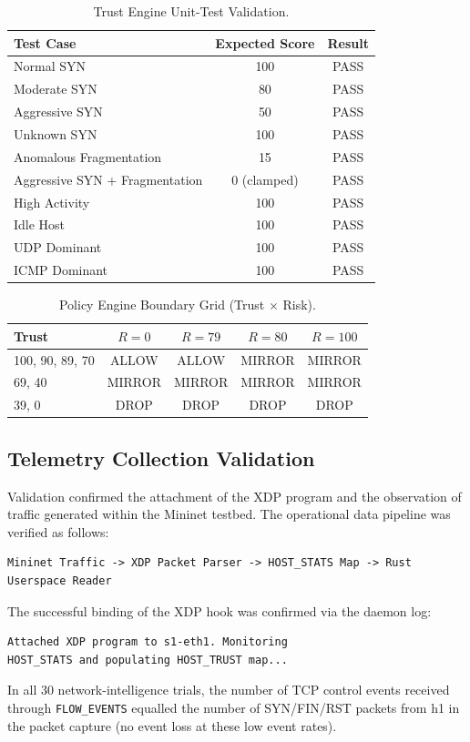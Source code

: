 \documentclass[conference]{IEEEtran}
\begin{document}
\begin{table}[h]
\centering
\caption{Trust Engine Unit-Test Validation.}
\label{tab:unitresults}
\begin{tabular}{lcc}
\toprule
Test Case & Expected Score & Result \\
\midrule
Normal SYN & 100 & PASS \\
Moderate SYN & 80 & PASS \\
Aggressive SYN & 50 & PASS \\
Unknown SYN & 100 & PASS \\
Anomalous Fragmentation & 15 & PASS \\
Aggressive SYN + Fragmentation & 0 (clamped) & PASS \\
High Activity & 100 & PASS \\
Idle Host & 100 & PASS \\
UDP Dominant & 100 & PASS \\
ICMP Dominant & 100 & PASS \\
\bottomrule
\end{tabular}
\end{table}

\begin{table}[h]
\centering
\caption{Policy Engine Boundary Grid (Trust $\times$ Risk).}
\label{tab:policyresults}
\setlength{\tabcolsep}{4pt}
\begin{tabular}{lcccc}
\toprule
Trust & $R=0$ & $R=79$ & $R=80$ & $R=100$ \\
\midrule
100, 90, 89, 70 & ALLOW & ALLOW & MIRROR & MIRROR \\
69, 40 & MIRROR & MIRROR & MIRROR & MIRROR \\
39, 0 & DROP & DROP & DROP & DROP \\
\bottomrule
\end{tabular}
\end{table}

\subsection{Telemetry Collection Validation}
Validation confirmed the attachment of the XDP program and the observation of traffic generated within the Mininet testbed. The operational data pipeline was verified as follows:
\begin{verbatim}
Mininet Traffic -> XDP Packet Parser -> HOST_STATS Map -> Rust Userspace Reader
\end{verbatim}

The successful binding of the XDP hook was confirmed via the daemon log:
\begin{verbatim}
Attached XDP program to s1-eth1. Monitoring
HOST_STATS and populating HOST_TRUST map...
\end{verbatim}
In all 30 network-intelligence trials, the number of TCP control events received through \texttt{FLOW\_EVENTS} equalled the number of SYN/FIN/RST packets from h1 in the packet capture (no event loss at these low event rates).
\end{document}
